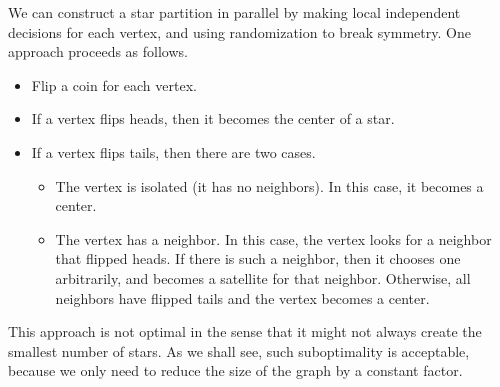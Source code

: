 \begin{group}
\begin{gram}
%
We can construct a star partition in parallel by making local
independent decisions for each vertex, and using randomization to
break symmetry.
%
%
One approach proceeds as follows. 
%
\begin{itemize}
\item Flip a coin for each vertex.

\item If a vertex flips heads, then it becomes the center of a star. 

\item If a vertex flips tails, then there are two cases.
\begin{itemize}
\item The vertex is isolated (it has no neighbors).  In this case, it
  becomes a center.
\item The vertex has a neighbor.  In this case, the vertex looks for a
  neighbor that flipped heads.  If there is such a neighbor, then it
  chooses one arbitrarily, and becomes a satellite for that
  neighbor. Otherwise, all neighbors have flipped tails and the
  vertex becomes a center.
\end{itemize}
\end{itemize}

%
%
This approach is not optimal in the sense that it might not always
create the smallest number of stars.
%
As we shall see, such suboptimality is acceptable, because we only
need to reduce the size of the graph by a constant factor.
\end{gram}


\end{group}
